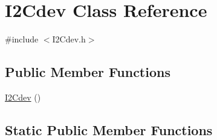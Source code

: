 \hypertarget{classI2Cdev}{}\section{I2\+Cdev Class Reference}
\label{classI2Cdev}


{\ttfamily \#include $<$I2\+Cdev.\+h$>$}

\subsection*{Public Member Functions}
\begin{DoxyCompactItemize}
\item 
\hyperlink{classI2Cdev_a0a466e2323d9f719a1ecc9fa11ac5c84}{I2\+Cdev} ()
\end{DoxyCompactItemize}
\subsection*{Static Public Member Functions}
